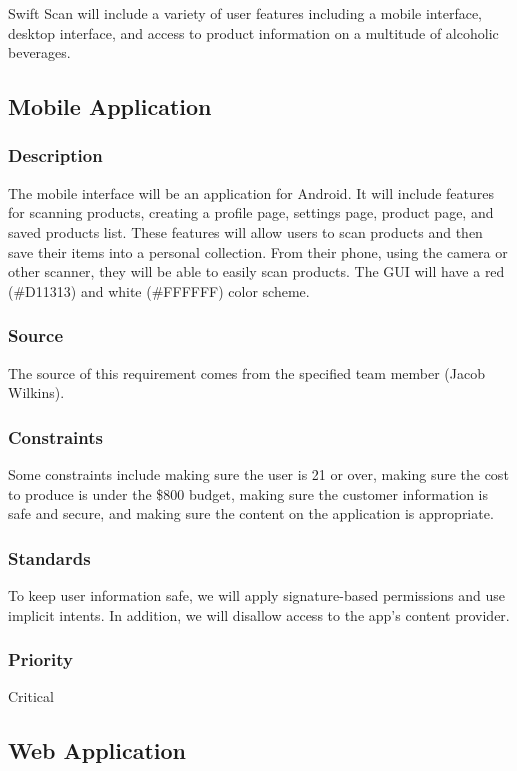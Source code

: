 Swift Scan will include a variety of user features including a mobile interface, desktop interface, and access to product information on a multitude of alcoholic beverages.

\subsection{Mobile Application}
\subsubsection{Description}
The mobile interface will be an application for Android. It will include features for scanning products, creating a profile page, settings page, product page, and saved products list. These features will allow users to scan products and then save their items into a personal collection. From their phone, using the camera or other scanner, they will be able to easily scan products. The GUI will have a red (\#D11313) and white (\#FFFFFF) color scheme.

\subsubsection{Source}
The source of this requirement comes from the specified team member (Jacob Wilkins).

\subsubsection{Constraints}
Some constraints include making sure the user is 21 or over, making sure the cost to produce is under the \$800 budget, making sure the customer information is safe and secure, and making sure the content on the application is appropriate.

\subsubsection{Standards}
To keep user information safe, we will apply signature-based permissions and use implicit intents. In addition, we will disallow access to the app's content provider.

\subsubsection{Priority}
Critical

\subsection{Web Application}

